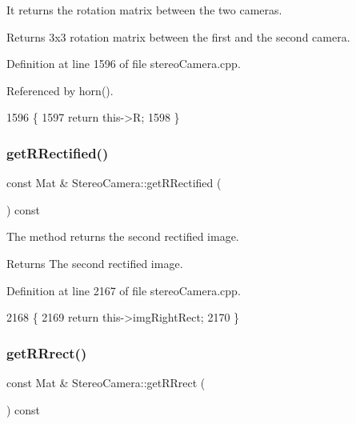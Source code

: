 It returns the rotation matrix between the two cameras. 

\begin{DoxyReturn}{Returns}
3x3 rotation matrix between the first and the second camera. 
\end{DoxyReturn}


Definition at line 1596 of file stereo\+Camera.\+cpp.



Referenced by horn().


\begin{DoxyCode}
1596                                            \{
1597     \textcolor{keywordflow}{return} this->R;
1598 \}
\end{DoxyCode}
\mbox{\label{classStereoCamera_aff19b07a766c01d04ed623a05ef4d67d}} 
\subsubsection{\texorpdfstring{get\+R\+Rectified()}{getRRectified()}}
{\footnotesize\ttfamily const Mat \& Stereo\+Camera\+::get\+R\+Rectified (\begin{DoxyParamCaption}{ }\end{DoxyParamCaption}) const}



The method returns the second rectified image. 

\begin{DoxyReturn}{Returns}
The second rectified image. 
\end{DoxyReturn}


Definition at line 2167 of file stereo\+Camera.\+cpp.


\begin{DoxyCode}
2168 \{
2169     \textcolor{keywordflow}{return} this->imgRightRect;
2170 \}
\end{DoxyCode}
\mbox{\label{classStereoCamera_a44e111911af89a299b134fd91b4bc7d6}} 
\subsubsection{\texorpdfstring{get\+R\+Rrect()}{getRRrect()}}
{\footnotesize\ttfamily const Mat \& Stereo\+Camera\+::get\+R\+Rrect (\begin{DoxyParamCaption}{ }\end{DoxyParamCaption}) const}




